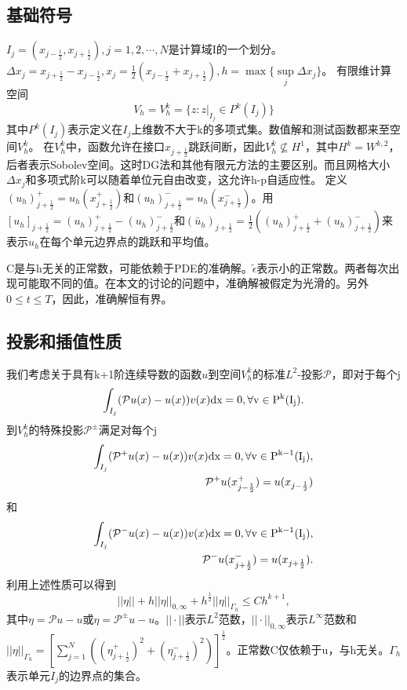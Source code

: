 \subsection{基础符号}
$I_j = (x_{j-\frac{1}{2}},x_{j+\frac{1}{2}}),j=1,2,\cdots,N$是计算域I的一个划分。$\Delta x_j = x_{j+\frac{1}{2}}-x_{j-\frac{1}{2}},x_j = \frac{1}{2}(x_{j-\frac{1}{2}}+x_{j+\frac{1}{2}}), h = \max\{\sup\limits_{j} \Delta x_j\}$。
有限维计算空间
\begin{equation*}
    V_h = V_h^k = \{z:z|_{I_j} \in P^k(I_j)\}
\end{equation*}
其中$P^k(I_j)$表示定义在$I_j$上维数不大于k的多项式集。数值解和测试函数都来至空间$V_h^k$。
在$V_h^k$中，函数允许在接口$x_{j+\frac{1}{2}}$跳跃间断，因此$V_h^k \not\subseteq H^1$，其中$H^k = W^{k,2}$，后者表示Sobolev空间。这时DG法和其他有限元方法的主要区别。而且网格大小$\Delta x_j$和多项式阶k可以随着单位元自由改变，这允许h-p自适应性。
定义$(u_h)^+_{j+\frac{1}{2}} = u_h(x^+_{j+\frac{1}{2}})$和$(u_h)^-_{j+\frac{1}{2}} = u_h(x^-_{j+\frac{1}{2}})$。用$[u_h]_{j+\frac{1}{2}} = (u_h)^+_{j+\frac{1}{2}} - (u_h)^-_{j+\frac{1}{2}}$和$(\bar{u}_h)_{j+\frac{1}{2}}=\frac{1}{2}((u_h)^+_{j+\frac{1}{2}}+(u_h)^-_{j+\frac{1}{2}})$来表示$u_h$在每个单元边界点的跳跃和平均值。

C是与h无关的正常数，可能依赖于PDE的准确解。$\tilde{\epsilon}$表示小的正常数。两者每次出现可能取不同的值。在本文的讨论的问题中，准确解被假定为光滑的。另外$0\leq t \leq T$，因此，准确解恒有界。
\subsection{投影和插值性质}
我们考虑关于具有k+1阶连续导数的函数$u$到空间$V_h^k$的标准$L^2$-投影$\mathcal{P}$，即对于每个j
\begin{equation}
    \int_{I_j}(\mathcal{P}u(x) - u(x))v(x)\rm{d} x = 0, \forall v \in P^k(I_j).
\end{equation}
到$V_h^k$的特殊投影$\mathcal{P}^{\pm}$满足对每个j
\begin{align}
    \int_{I_j}(\mathcal{P}^+u(x) - u(x))v(x)\rm{d} x = 0, \forall v \in P^{k-1}(I_j), \\
    \mathcal{P}^+u(x_{j-\frac{1}{2}}^+) = u(x_{j-\frac{1}{2}})\nonumber
\end{align}
和
\begin{align}
    \int_{I_j}(\mathcal{P}^-u(x) - u(x))v(x)\rm{d} x = 0, \forall v \in P^{k-1}(I_j), \\
    \mathcal{P}^-u(x_{j+\frac{1}{2}}^-) = u(x_{j+\frac{1}{2}}).\nonumber
\end{align}
利用上述性质可以得到
\begin{equation}
    ||\eta|| + h||\eta||_{0,\infty} + h^{\frac{1}{2}}||\eta||_{\Gamma_h} \leq Ch^{k+1},
\end{equation}
其中$\eta = \mathcal{P}u - u$或$\eta = \mathcal{P}^{\pm}u - u$。$||\cdot||$表示$L^2$范数，$||\cdot||_{0,\infty}$表示$L^{\infty}$范数和$||\eta||_{\Gamma_h} = [\sum_{j=1}^{N}((\eta_{j+\frac{1}{2}}^+)^2 + (\eta_{j+\frac{1}{2}}^-)^2)]^{\frac{1}{2}}$。正常数C仅依赖于u，与h无关。$\Gamma_h$表示单元$I_j$的边界点的集合。
